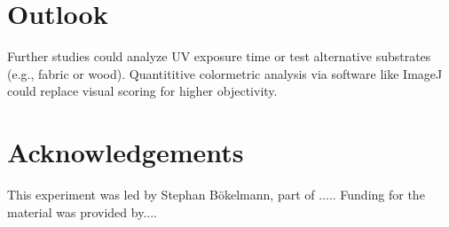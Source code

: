 \documentclass[a4paper,12pt]{article}
\begin{document}
\section{Outlook}
Further studies could analyze UV exposure time or test alternative substrates (e.g., fabric or wood). Quantititive colormetric analysis via software like ImageJ could replace visual scoring for higher objectivity.

\section{Acknowledgements}
This experiment was led by Stephan Bökelmann, part of ..... Funding for the material was provided by....
\end{document}
